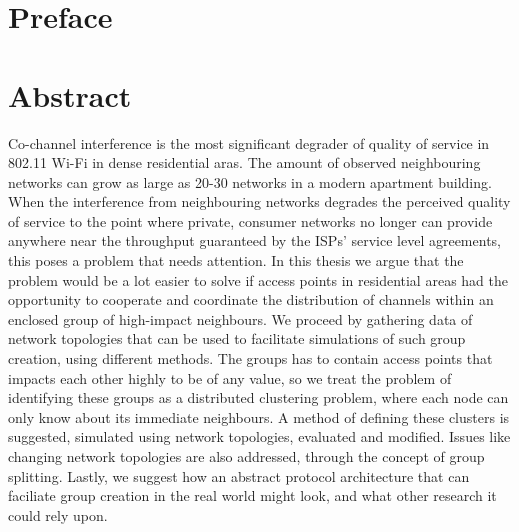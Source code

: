 \chapter*{Preface}

\chapter*{Abstract}
Co-channel interference is the most significant degrader of quality of service in 802.11 Wi-Fi in dense residential aras.
The amount of observed neighbouring networks can grow as large as 20-30 networks in a modern apartment building. When
the interference from neighbouring networks degrades the perceived quality of service to the point where private, consumer networks no longer can provide
anywhere near the throughput guaranteed by the ISPs' service level agreements, this poses a problem that needs attention. 
In this thesis we argue that the problem would be a lot easier to solve if access points in residential areas had the opportunity to cooperate and coordinate
the distribution of channels within an enclosed group of high-impact neighbours. We proceed by gathering data of network topologies that can be used to facilitate simulations of such group creation, using different methods.
The groups has to contain access points that impacts each other highly to be of any value, so we treat the problem of identifying these groups as a distributed clustering problem,
where each node can only know about its immediate neighbours. A method of defining these clusters is suggested, simulated using network topologies, evaluated and modified.
Issues like changing network topologies are also addressed, through the concept of group splitting. Lastly, we suggest how an abstract protocol architecture that can faciliate group creation
in the real world might look, and what other research it could rely upon. 
